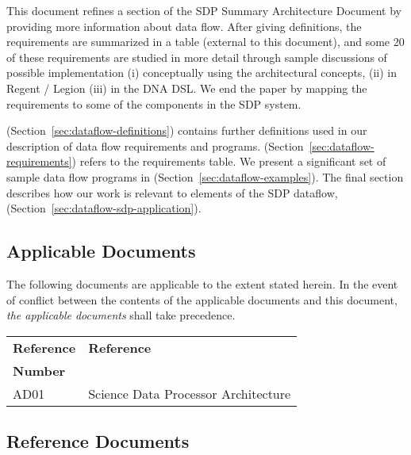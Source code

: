 \documentclass[11pt,a4paper]{article}
\begin{document}
\sdpfrontpage

\sdptableofcontents

\sdplistoffigures

\sdplistoftables

\sdpsummary

This document refines a section of the SDP Summary Architecture Document by providing more information about data flow.  After giving definitions, the requirements are summarized in a table (external to this document), and some 20 of these requirements are studied in more detail through sample discussions of possible implementation (i) conceptually using the architectural concepts, (ii) in Regent / Legion (iii) in the DNA DSL.  We end the paper by mapping the requirements to some of the components in the SDP system.


(Section~\ref{sec:dataflow-definitions}) contains further definitions used in our description of data flow requirements and programs. 
(Section~\ref{sec:dataflow-requirements}) refers to the requirements table. We present a significant set of sample data flow programs in 
(Section~\ref{sec:dataflow-examples}). The final section describes how our work is relevant to elements of the SDP dataflow, 
(Section~\ref{sec:dataflow-sdp-application}).

\sdpreferencedocs

\subsection*{Applicable Documents}

\iffalse
The following documents are applicable to the extent stated herein. In the
event of conflict between the contents of the applicable documents and this
document, \emph{the applicable documents} shall take precedence.

\begin{center}{
\begin{tabularx}{\textwidth}{|X|X|}
    \hline
    \bf{Reference} & \bf{Reference}\\
    \bf{Number} & \\
    \hline
    AD01 & Science Data Processor Architecture\\\hline
\end{tabularx}}
\end{center}

\subsection*{Reference Documents}
\end{document}

